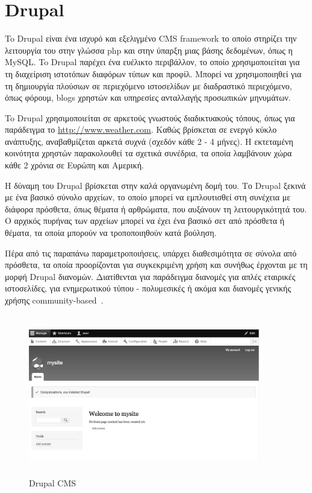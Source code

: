 \documentclass[12pt]{report}
\begin{document}
\section{\textlatin{Drupal}}
To \textlatin{Drupal} είναι ένα ισχυρό και εξελιγμένο \textlatin{CMS framework} το οποίο στηρίζει την λειτουργία του στην γλώσσα \textlatin{php} και στην ύπαρξη μιας βάσης δεδομένων, όπως η \textlatin{MySQL}. To  \textlatin{Drupal} παρέχει ένα ευέλικτο περιβάλλον, το οποίο χρησιμοποιείται για τη διαχείριση ιστοτόπων διαφόρων τύπων και προφίλ. Μπορεί να χρησιμοποιηθεί για τη δημιουργία πλούσιων σε περιεχόμενο ιστοσελίδων με διαδραστικό περιεχόμενο, όπως φόρουμ, \textlatin{blogs} χρηστών και υπηρεσίες ανταλλαγής προσωπικών μηνυμάτων.

To \textlatin{Drupal} χρησιμοποιείται σε αρκετούς γνωστούς διαδικτυακούς τόπους, όπως για παράδειγμα το \textlatin{\url{http://www.weather.com}}. Καθώς βρίσκεται σε ενεργό κύκλο ανάπτυξης, αναβαθμίζεται αρκετά συχνά (σχεδόν κάθε 2 - 4 μήνες). Η εκτεταμένη κοινότητα χρηστών παρακολουθεί τα σχετικά συνέδρια, τα οποία λαμβάνουν χώρα κάθε 2 χρόνια σε Ευρώπη και Αμερική.

Η δύναμη του \textlatin{Drupal} βρίσκεται στην καλά οργανωμένη δομή του. Το \textlatin{Drupal} ξεκινά με ένα βασικό σύνολο αρχείων, το οποίο μπορεί να εμπλουτισθεί στη συνέχεια με διάφορα πρόσθετα, όπως θέματα ή αρθρώματα, που αυξάνουν τη λειτουργικότητά του. Ο αρχικός πυρήνας των αρχείων μπορεί να έχει ένα βασικό σετ από πρόσθετα ή θέματα, τα οποία μπορούν να τροποποιηθούν κατά βούληση.

Πέρα από τις παραπάνω παραμετροποιήσεις, υπάρχει διαθεσιμότητα σε σύνολα από πρόσθετα, τα οποία προορίζονται για συγκεκριμένη χρήση και συνήθως έρχονται με τη μορφή \textlatin{Drupal} διανομών. Διατίθενται για παράδειγμα διανομές για απλές εταιρικές ιστοσελίδες, για ενημερωτικού τύπου - πολυμεσικές ή ακόμα και διανομές γενικής χρήσης \textlatin{community-based}~\cite{opensource_cms_demos_and_information}.
\begin{figure}[H]
\centering
\includegraphics[width=0.9\textwidth, height=7cm]{drupal-gray}
\caption{\textlatin{Drupal CMS}}
\label{fig:drupal}
\end{figure}
\end{document}
